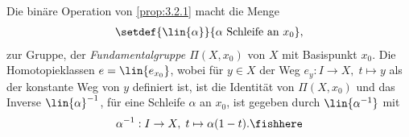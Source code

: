 \begin{prop}
\label{prop:3.2.2}
Die binäre Operation von \ref{prop:3.2.1} macht die Menge
\begin{align*}
\setdef{\lin{\alpha}}{\alpha \text{ Schleife an } x_0},
\end{align*}
zur Gruppe, der \emph{Fundamentalgruppe $\Pi(X,x_0)$} von $X$ mit Basispunkt
$x_0$. Die Homotopieklassen $e = \lin{e_{x_0}}$, wobei für $y\in X$ der Weg
$e_y: I\to X,\; t\mapsto y$ als der konstante Weg von $y$ definiert ist, ist
die Identität von $\Pi(X,x_0)$ und das Inverse $\lin{\alpha}^{-1}$, für eine Schleife $\alpha$
an $x_0$, ist gegeben durch $\lin{\alpha^{-1}}$ mit
\begin{align*}
\alpha^{-1}: I\to X,\; t\mapsto \alpha(1-t).\fishhere
\end{align*}
\end{prop}
